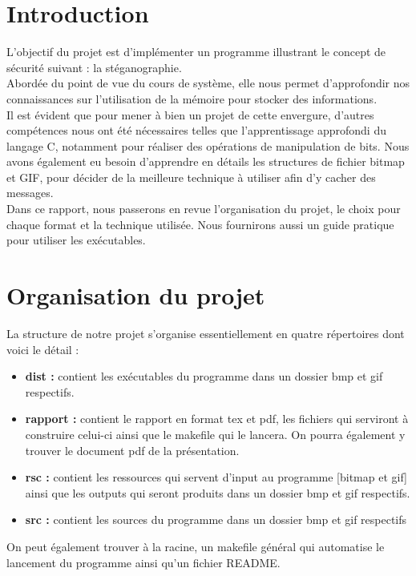 \section{Introduction}
L'objectif du projet est d'implémenter un programme illustrant le concept de sécurité suivant : la stéganographie.\\

Abordée du point de vue du cours de système, elle nous permet d'approfondir nos connaissances sur l'utilisation de la mémoire
pour stocker des informations.\\

Il est évident que pour mener à bien un projet de cette envergure, d'autres compétences nous ont été nécessaires
telles que l'apprentissage approfondi du langage C, notamment pour réaliser des opérations de manipulation de bits.
Nous avons également eu besoin d'apprendre en détails les structures de fichier bitmap et GIF, pour décider de la meilleure technique à
utiliser afin d'y cacher des messages.\\

Dans ce rapport, nous passerons en revue l'organisation du projet, le choix pour chaque format et la technique utilisée. 
Nous fournirons aussi un guide pratique pour utiliser les exécutables. 

\vspace{1.5cm}

\newpage
\section{Organisation du projet}
La structure de notre projet s'organise essentiellement en quatre répertoires dont voici le détail :\\ 

\begin{itemize}
    \item \textbf{dist :} contient les exécutables du programme dans un dossier bmp et gif respectifs.
    \item \textbf{rapport :} contient le rapport en format tex et pdf, les fichiers qui serviront à construire celui-ci 
    ainsi que le makefile qui le lancera. On pourra également y trouver le document pdf de la présentation.
    \item \textbf{rsc :} contient les ressources qui servent d'input au programme [bitmap et gif] ainsi que les outputs 
    qui seront produits dans un dossier bmp et 
    gif respectifs.
    \item \textbf{src :} contient les sources du programme dans un dossier bmp et gif respectifs\\
\end{itemize}
On peut également trouver à la racine, un makefile général qui automatise le lancement du programme ainsi qu'un fichier README.

